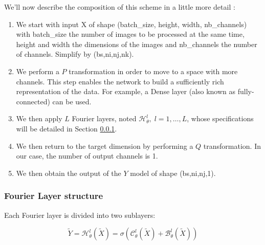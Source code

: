 We'll now describe the composition of this scheme in a little more detail :
\begin{enumerate}[label=\textbullet]
	\item We start with input X of shape (batch\_size, height, width, nb\_channels) with batch\_size the number of images to be processed at the same time, height and width the dimensions of the images and nb\_channels the number of channels. Simplify by (bs,ni,nj,nk).
	\item We perform a $P$ transformation in order to move to a space with more channels. This step enables the network to build a sufficiently rich representation of the data.  For example, a Dense layer (also known as fully-connected) can be used. 	
	\item We then apply $L$ Fourier layers, noted $\mathcal{H}_\theta^l,\; l=1,\dots,L$, whose specifications will be detailed in Section \ref{FNO.fourierlayer}.
	\item We then return to the target dimension by performing a $Q$ transformation. In our case, the number of output channels is 1.
	\item We then obtain the output of the $Y$ model of shape (bs,ni,nj,1). 
\end{enumerate}


\subsubsection{Fourier Layer structure} \label{FNO.fourierlayer}


Each Fourier layer is divided into two sublayers:

\begin{equation*}
	\tilde{Y}=\mathcal{H}_\theta^l(\tilde{X})=\sigma\left(\mathcal{C}_\theta^l(\tilde{X})+\mathcal{B}_\theta^l(\tilde{X})\right)
\end{equation*}



